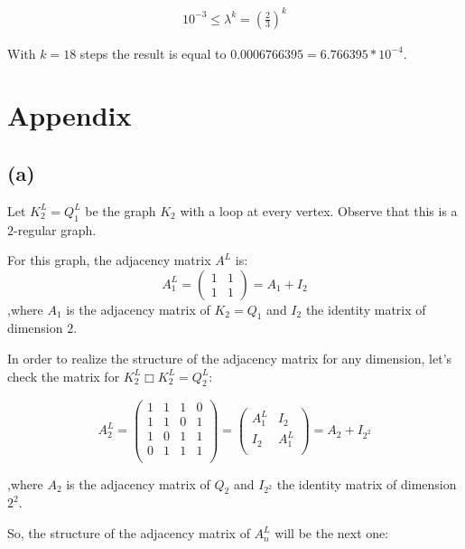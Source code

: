 \documentclass{article}
\begin{document}
\begin{align}
    10^{-3} \leq \lambda^k = \left( \frac{2}{3} \right)^k
\end{align}
 
\noindent With $k = 18$ steps the result is equal to $0.0006766395 = 6.766395 * 10^{-4}$.

\newpage
\section*{Appendix}

\subsection*{(a)}

\noindent Let $K^{L}_{2} = Q^{L}_{1}$ be the graph $K_2$ with a loop at every vertex. Observe that this is a $2$-regular graph.

\noindent For this graph, the adjacency matrix $A^{L}$ is: 
$$
A^{L}_{1} = 
    \begin{pmatrix}
    1 & 1 \\
    1 & 1
    \end{pmatrix}
    = A_{1} + I_{2}
$$ 
\noindent ,where $A_{1}$ is the adjacency matrix of $K_2 = Q_1$ and $I_2$ the identity matrix of dimension $2$.

\noindent In order to realize the structure of the adjacency matrix for any dimension, let's check the matrix for $K^{L}_{2} \Box K^{L}_{2} = Q^{L}_{2}$:

$$
A^{L}_{2} = 
    \begin{pmatrix}
    1 & 1 & 1 & 0\\
    1 & 1 & 0 & 1\\
    1 & 0 & 1 & 1\\
    0 & 1 & 1 & 1\\
    \end{pmatrix}
    = 
    \begin{pmatrix}
    A^{L}_{1} & I_2\\
    I_2 & A^{L}_{1}\\
    \end{pmatrix}
    = A_{2} + I_{2^2}
$$ 

\noindent ,where $A_{2}$ is the adjacency matrix of $Q_2$ and $I_{2^2}$ the identity matrix of dimension $2^2$.

\noindent So, the structure of the adjacency matrix of $A^{L}_{n}$ will be the next one:
\end{document}
